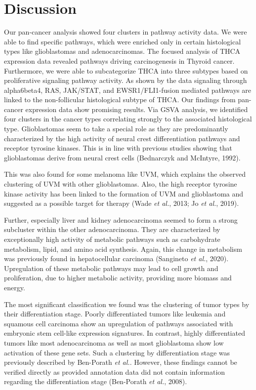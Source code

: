 \documentclass[
  11pt,
  parskip,
  oneside]{scrreprt}
\begin{document}
\hypertarget{discussion}{%
\chapter{Discussion}\label{discussion}}

Our pan-cancer analysis showed four clusters in pathway activity data.
We were able to find specific pathways, which were enriched only in
certain histological types like glioblastomas and adenocarcinomas. The
focused analysis of THCA expression data revealed pathways driving
carcinogenesis in Thyroid cancer. Furthermore, we were able to
subcategorize THCA into three subtypes based on proliferative signaling
pathway activity. As shown by the data signaling through alpha6beta4,
RAS, JAK/STAT, and EWSR1/FLI1-fusion mediated pathways are linked to the
non-follicular histological subtype of THCA. Our findings from
pan-cancer expression data show promising results. Via GSVA analysis, we
identified four clusters in the cancer types correlating strongly to the
associated histological type. Glioblastomas seem to take a special role
as they are predominantly characterized by the high activity of neural
crest differentiation pathways and receptor tyrosine kinases. This is in
line with previous studies showing that glioblastomas derive from neural
crest cells (Bednarczyk and McIntyre, 1992).

This was also found for some melanoma like UVM, which explains the
observed clustering of UVM with other glioblastomas. Also, the high
receptor tyrosine kinase activity has been linked to the formation of
UVM and glioblastoma and suggested as a possible target for therapy
(Wade \emph{et al.}, 2013; Jo \emph{et al.}, 2019).

Further, especially liver and kidney adenocarcinoma seemed to form a
strong subcluster within the other adenocarcinoma. They are
characterized by exceptionally high activity of metabolic pathways such
as carbohydrate metabolism, lipid, and amino acid synthesis. Again, this
change in metabolism was previously found in hepatocellular carcinoma
(Sangineto \emph{et al.}, 2020). Upregulation of these metabolic
pathways may lead to cell growth and proliferation, due to higher
metabolic activity, providing more biomass and energy.

The most significant classification we found was the clustering of tumor
types by their differentiation stage. Poorly differentiated tumors like
leukemia and squamous cell carcinoma show an upregulation of pathways
associated with embryonic stem cell-like expression signatures. In
contrast, highly differentiated tumors like most adenocarcinoma as well
as most glioblastoma show low activation of these gene sets. Such a
clustering by differentiation stage was previously described by
Ben-Porath \emph{et al.}. However, these findings cannot be verified
directly as provided annotation data did not contain information
regarding the differentiation stage (Ben-Porath \emph{et al.}, 2008).
\end{document}
